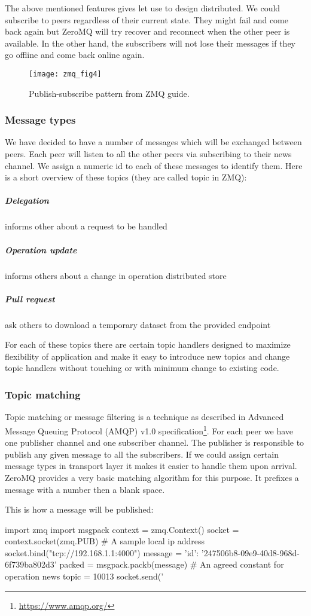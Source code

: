 The above mentioned features gives let use to design distributed.
We could subscribe to peers regardless of their current state. 
They might fail and come back again but ZeroMQ will try recover and reconnect when the other peer is available.
In the other hand, the subscribers will not lose their messages if they go offline and come back online again.

\begin{figure}[h]
  \centering
  \texttt{[image: zmq\_fig4]}
  \caption[Publish-subscribe pattern.]
   {Publish-subscribe pattern from ZMQ guide. \cite{zguide}}
\end{figure}

\subsubsection{Message types}
We have decided to have a number of messages which will be exchanged between peers.
Each peer will listen to all the other peers via subscribing to their news channel.
We assign a numeric id to each of these messages to identify them. 
Here is a short overview of these topics (they are called topic in ZMQ):

\subparagraph{Delegation} informs other about a request to be handled
\subparagraph{Operation update} informs others about a change in operation distributed store
\subparagraph{Pull request} ask others to download a temporary dataset from the provided endpoint

For each of these topics there are certain topic handlers designed to maximize flexibility of application and
make it easy to introduce new topics and change topic handlers without touching or with minimum change to existing code.

\subsubsection{Topic matching}
Topic matching or message filtering is a technique as described 
in Advanced Message Queuing Protocol (AMQP) v1.0 specification\footnote{\url{https://www.amqp.org/}}.
For each peer we have one publisher channel and one subscriber channel. 
The publisher is responsible to publish any given message to all the subscribers.
If we could assign certain message types in transport layer it makes it easier
to handle them upon arrival. 
ZeroMQ provides a very basic matching algorithm for this purpose.
It prefixes a message with a number then a blank space. 

This is how a message will be published:
\begin{python}
import zmq
import msgpack
context = zmq.Context()
socket = context.socket(zmq.PUB)
# A sample local ip address
socket.bind("tcp://192.168.1.1:4000") 
message = {'id': '247506b8-09e9-40d8-968d-6f739ba802d3'}
packed = msgpack.packb(message)
# An agreed constant for operation news
topic = 10013
socket.send('%
\end{python}

